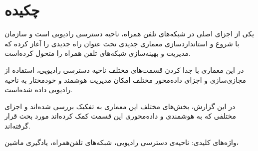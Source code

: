 \chapter{چکیده}
یکی از اجزای اصلی در شبکه‌های تلفن همراه، ناحیه دسترسی رادیویی است و سازمان 
با شروع و استانداردسازی معماری جدیدی تحت عنوان
راه جدیدی را آغاز کرده که مدیریت و بهینه‌سازی شبکه‌های تلفن همراه را متحول کرده‌است. 

در این معماری با جدا کردن قسمت‌های مختلف ناحیه دسترسی رادیویی، استفاده از مجازی‌سازی و اجزای داده‌محور مختلف امکان مدیریت هوشمند و خودمختار به ناحیه رادیویی داده شده‌است. 

در این گزارش، بخش‌های مختلف این معماری به تفکیک بررسی شده‌اند و اجزای مختلفی که به هوشمندی و داده‌محوری این قسمت کمک کرده‌اند مورد بحث قرار گرفته‌اند.

واژه‌های کلیدی: ناحیه‌ی دسترسی رادیویی، شبکه‌های تلفن‌همراه، یادگیری ماشین، 

